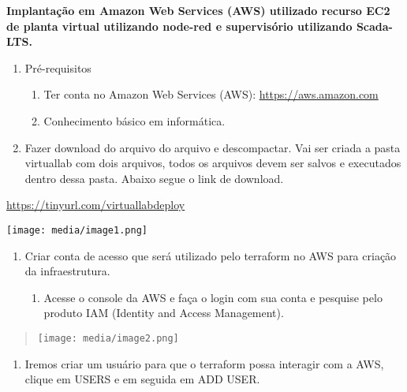 \textbf{Implantação em Amazon Web Services (AWS) utilizado recurso EC2
de planta virtual utilizando node-red e supervisório utilizando
Scada-LTS.}

\begin{enumerate}
\def\labelenumi{\arabic{enumi}.}
\item
  Pré-requisitos

  \begin{enumerate}
  \def\labelenumii{\arabic{enumii}.}
  \item
    Ter conta no Amazon Web Services (AWS): \url{https://aws.amazon.com}
  \item
    Conhecimento básico em informática.
  \end{enumerate}
\item
  Fazer download do arquivo do arquivo e descompactar. Vai ser criada a
  pasta virtuallab com dois arquivos, todos os arquivos devem ser salvos
  e executados dentro dessa pasta. Abaixo segue o link de download.
\end{enumerate}

\url{https://tinyurl.com/virtuallabdeploy}

\texttt{[image: media/image1.png]}

\begin{enumerate}
\def\labelenumi{\arabic{enumi}.}
\setcounter{enumi}{2}
\item
  Criar conta de acesso que será utilizado pelo terraform no AWS para
  criação da infraestrutura.

  \begin{enumerate}
  \def\labelenumii{\arabic{enumii}.}
  \item
    Acesse o console da AWS e faça o login com sua conta e pesquise pelo
    produto IAM (Identity and Access Management).
  \end{enumerate}
\end{enumerate}

\begin{quote}
\texttt{[image: media/image2.png]}
\end{quote}

\begin{enumerate}
\def\labelenumi{\arabic{enumi}.}
\setcounter{enumi}{1}
\item
  Iremos criar um usuário para que o terraform possa interagir com a
  AWS, clique em USERS e em seguida em ADD USER.
\end{enumerate}

